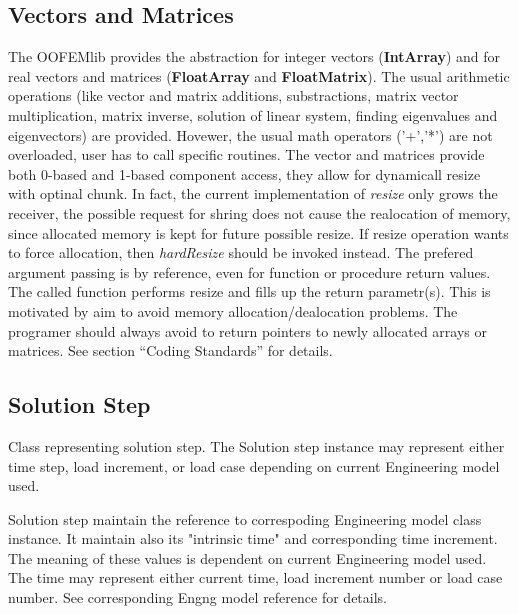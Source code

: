 \documentclass[a4paper]{article}
\newcommand{\class}[1]{{\bf #1}}
\newcommand{\service}[1]{{\em #1}}
\begin{document}
\subsection{Vectors and Matrices}
The OOFEMlib provides the abstraction for integer vectors (\class{IntArray})
and for real vectors and matrices (\class{FloatArray} and
\class{FloatMatrix}). The usual arithmetic operations (like vector and
matrix additions, substractions, matrix vector multiplication, matrix
inverse, solution of linear system, finding eigenvalues and
eigenvectors) are provided. Hovewer, the usual math operators ('+','*')
are not overloaded, user has to call specific routines. 
The vector and matrices provide both 0-based and 1-based component
access, they allow for dynamicall resize with optinal chunk. In fact,
the current implementation of \service{resize} only grows the
receiver, the possible request for shring does not cause the
realocation of memory, since allocated memory is kept for future possible resize. If
resize operation wants to force allocation, then \service{hardResize}
should be invoked instead. 
The prefered argument passing is by reference, even for function or
procedure return values.
The called function performs resize and fills up
the return parametr(s). This is motivated by aim to avoid memory
allocation/dealocation problems. The programer should always avoid to
return pointers to newly allocated arrays or matrices. 
See section ``Coding Standards'' for
details.

\subsection{Solution Step} 
Class representing solution step. The Solution step instance may represent either 
time step, load increment, or load case depending on current Engineering model used.

Solution step maintain the reference to correspoding Engineering model class instance.
It maintain also its "intrinsic time" and corresponding time increment. The meaning of these 
values is dependent on current Engineering model used. The time may represent either
current time, load increment number or load case number. See corresponding 
Engng model reference for details.
	
\end{document}
